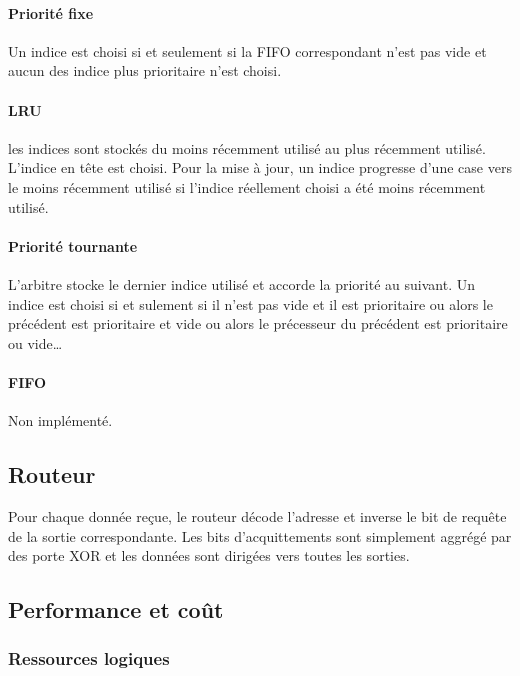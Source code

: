 \paragraph{Priorité fixe}

Un indice est choisi si et seulement si la FIFO correspondant n'est pas vide et
aucun des indice plus prioritaire n'est choisi.

\paragraph{LRU}

les indices sont stockés du moins récemment utilisé au plus récemment utilisé.
L'indice en tête est choisi. Pour la mise à jour, un indice progresse d'une case
vers le moins récemment utilisé si l'indice réellement choisi a été moins
récemment utilisé.

\paragraph{Priorité tournante}

L'arbitre stocke le dernier indice utilisé et accorde la priorité au suivant. Un
indice est choisi si et sulement si il n'est pas vide et il est prioritaire ou
alors le précédent est prioritaire et vide ou alors le précesseur du précédent
est prioritaire ou vide\ldots

\paragraph{FIFO} Non implémenté.

\subsection{Routeur}

Pour chaque donnée reçue, le routeur décode l'adresse et inverse le bit de
requête de la sortie correspondante. Les bits d'acquittements sont simplement
aggrégé par des porte XOR et les données sont dirigées vers toutes les sorties.

\subsection{Performance et coût}

\subsubsection{Ressources logiques}

